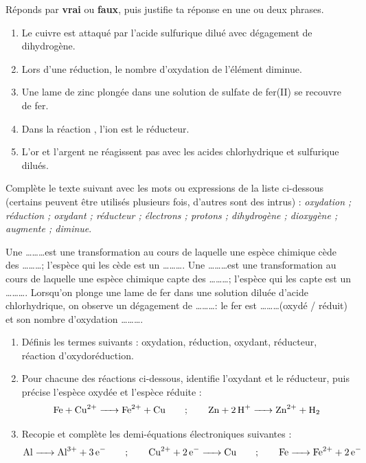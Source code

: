 \documentclass[11pt]{article}
\begin{document}
\begin{exercice}
Réponds par \textbf{vrai} ou \textbf{faux}, puis justifie ta réponse en une ou deux phrases.
\begin{enumerate}
\item Le cuivre est attaqué par l'acide sulfurique dilué avec dégagement de dihydrogène.
\item Lors d'une réduction, le nombre d'oxydation de l'élément diminue.
\item Une lame de zinc plongée dans une solution de sulfate de fer(II) se recouvre de fer.
\item Dans la réaction , l'ion  est le réducteur.
\item L'or et l'argent ne réagissent pas avec les acides chlorhydrique et sulfurique dilués.
\end{enumerate}
\end{exercice}

\begin{exercice}
Complète le texte suivant avec les mots ou expressions de la liste ci-dessous (certains peuvent être utilisés plusieurs fois, d'autres sont des intrus) : \emph{oxydation ; réduction ; oxydant ; réducteur ; électrons ; protons ; dihydrogène ; dioxygène ; augmente ; diminue}.

Une \ldots\ldots\ldots est une transformation au cours de laquelle une espèce chimique cède des \ldots\ldots\ldots ; l'espèce qui les cède est un \ldots\ldots\ldots. Une \ldots\ldots\ldots est une transformation au cours de laquelle une espèce chimique capte des \ldots\ldots\ldots ; l'espèce qui les capte est un \ldots\ldots\ldots. Lorsqu'on plonge une lame de fer dans une solution diluée d'acide chlorhydrique, on observe un dégagement de \ldots\ldots\ldots : le fer est \ldots\ldots\ldots (oxydé / réduit) et son nombre d'oxydation \ldots\ldots\ldots.
\end{exercice}

\begin{exercice}
\begin{enumerate}
\item Définis les termes suivants : oxydation, réduction, oxydant, réducteur, réaction d'oxydoréduction.
\item Pour chacune des réactions ci-dessous, identifie l'oxydant et le réducteur, puis précise l'espèce oxydée et l'espèce réduite :
\[ \ce{Fe + Cu^2+ -> Fe^2+ + Cu} \qquad ; \qquad \ce{Zn + 2H+ -> Zn^2+ + H2} \]
\item Recopie et complète les demi-équations électroniques suivantes :
\[ \ce{Al -> Al^3+ + 3e-} \qquad ; \qquad \ce{Cu^2+ + 2e- -> Cu} \qquad ; \qquad \ce{Fe -> Fe^2+ + 2e-} \]
\end{enumerate}
\end{exercice}
\end{document}
